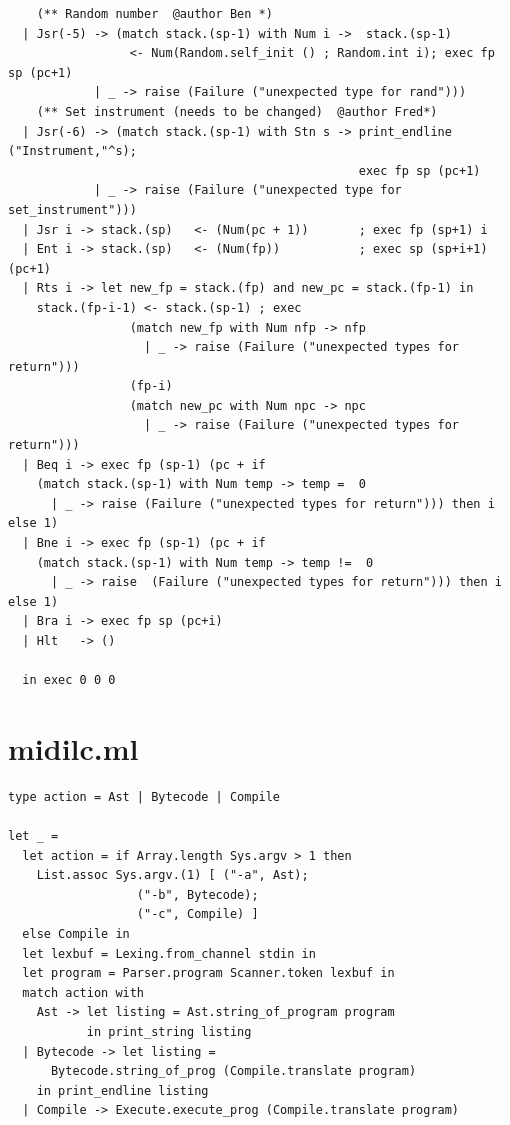 \documentclass[12pt,A4]{book}
\begin{document}
\begin{verbatim}
    (** Random number  @author Ben *)
  | Jsr(-5) -> (match stack.(sp-1) with Num i ->  stack.(sp-1) 
                 <- Num(Random.self_init () ; Random.int i); exec fp sp (pc+1)
            | _ -> raise (Failure ("unexpected type for rand")))
    (** Set instrument (needs to be changed)  @author Fred*)
  | Jsr(-6) -> (match stack.(sp-1) with Stn s -> print_endline ("Instrument,"^s); 
                                                 exec fp sp (pc+1)
			| _ -> raise (Failure ("unexpected type for set_instrument")))
  | Jsr i -> stack.(sp)   <- (Num(pc + 1))       ; exec fp (sp+1) i
  | Ent i -> stack.(sp)   <- (Num(fp))           ; exec sp (sp+i+1) (pc+1)
  | Rts i -> let new_fp = stack.(fp) and new_pc = stack.(fp-1) in
    stack.(fp-i-1) <- stack.(sp-1) ; exec 
                 (match new_fp with Num nfp -> nfp  
                   | _ -> raise (Failure ("unexpected types for return"))) 
                 (fp-i) 
                 (match new_pc with Num npc -> npc  
                   | _ -> raise (Failure ("unexpected types for return")))
  | Beq i -> exec fp (sp-1) (pc + if 
    (match stack.(sp-1) with Num temp -> temp =  0 
      | _ -> raise (Failure ("unexpected types for return"))) then i else 1)
  | Bne i -> exec fp (sp-1) (pc + if 
    (match stack.(sp-1) with Num temp -> temp !=  0 
      | _ -> raise  (Failure ("unexpected types for return"))) then i else 1)
  | Bra i -> exec fp sp (pc+i)
  | Hlt   -> ()

  in exec 0 0 0
\end{verbatim}
\section{midilc.ml}
\begin{verbatim}
type action = Ast | Bytecode | Compile

let _ =
  let action = if Array.length Sys.argv > 1 then
    List.assoc Sys.argv.(1) [ ("-a", Ast);
			      ("-b", Bytecode);
			      ("-c", Compile) ]
  else Compile in
  let lexbuf = Lexing.from_channel stdin in
  let program = Parser.program Scanner.token lexbuf in
  match action with
    Ast -> let listing = Ast.string_of_program program
           in print_string listing
  | Bytecode -> let listing =
      Bytecode.string_of_prog (Compile.translate program)
    in print_endline listing
  | Compile -> Execute.execute_prog (Compile.translate program)
 
\end{verbatim}
\end{document}
